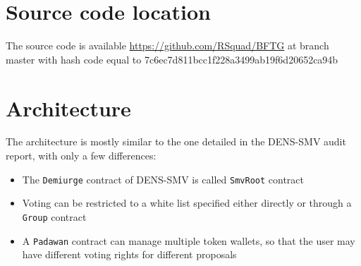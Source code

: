 
\section{Source code location}

The source code is available
\url{https://github.com/RSquad/BFTG} at branch master with hash code equal to
7c6ec7d811bcc1f228a3499ab19f6d20652ca94b

\section{Architecture}

The architecture is mostly similar to the one detailed in the DENS-SMV
audit report, with only a few differences:

\begin{itemize}
\item The {\tt Demiurge} contract of DENS-SMV is called {\tt SmvRoot} contract
\item Voting can be restricted to a white list specified either directly or through a {\tt Group} contract
\item A {\tt Padawan} contract can manage multiple token wallets, so that the user may have different voting rights for different proposals
\end{itemize}
